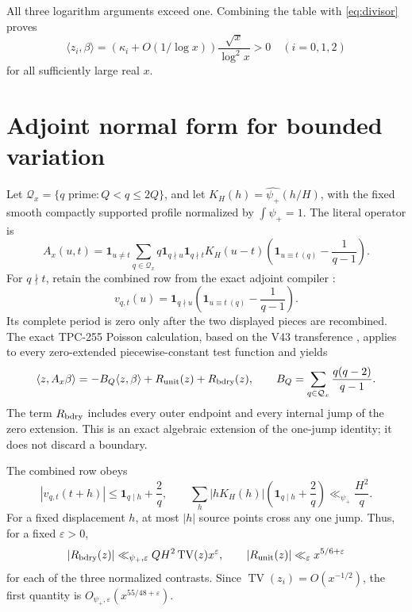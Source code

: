 \documentclass[10pt]{article}
\newcommand{\one}{\mathbf 1}
\newcommand{\ip}[2]{\langle #1,#2\rangle}
\newcommand{\Ax}{A_x}
\newcommand{\Qx}{\mathcal Q_x}
\newcommand{\TV}{\operatorname{TV}}
\newcommand{\e}{\varepsilon}
\begin{document}
All three logarithm arguments exceed one.  Combining the table with
\eqref{eq:divisor} proves
\begin{equation}
 \ip{z_i}{\beta}=(\kappa_i+O(1/\log x))\frac{\sqrt{x}}{\log^2x}>0
 \quad (i=0,1,2)                                  \label{eq:betacontrasts}
\end{equation}
for all sufficiently large real \(x\).

\section{Adjoint normal form for bounded variation}

Let \(\Qx=\{q\text{ prime}:Q<q\leq2Q\}\), and let
\(K_H(h)=\widehat{\psi_+}(h/H)\), with the fixed smooth compactly supported
profile normalized by \(\int\psi_+=1\).  The literal operator is
\begin{equation}
 \Ax(u,t)=\one_{u\ne t}\sum_{q\in\Qx}q\one_{q\nmid u}\one_{q\nmid t}
 K_H(u-t)\left(\one_{u\equiv t\ (q)}-\frac1{q-1}\right). \label{eq:operator}
\end{equation}
For \(q\nmid t\), retain the combined row from the exact adjoint compiler
\cite{tpc255}:
\[
 v_{q,t}(u)=\one_{q\nmid u}\left(\one_{u\equiv t\ (q)}-\frac1{q-1}\right).
\]
Its complete period is zero only after the two displayed pieces are
recombined.  The exact TPC-255 Poisson calculation, based on the V43
transference \cite{v43}, applies to every
zero-extended piecewise-constant test function and yields
\begin{equation}
 \ip{z}{\Ax\beta}=-B_Q\ip{z}{\beta}+R_{\rm unit}(z)+R_{\rm bdry}(z),
 \qquad B_Q=\sum_{q\in\Qx}\frac{q(q-2)}{q-1}.             \label{eq:normalform}
\end{equation}
The term \(R_{\rm bdry}\) includes every outer endpoint and every internal
jump of the zero extension.  This is an exact algebraic extension of the
one-jump identity; it does not discard a boundary.

The combined row obeys
\begin{equation}
 |v_{q,t}(t+h)|\leq\one_{q\mid h}+\frac2q,\qquad
 \sum_h|hK_H(h)|\left(\one_{q\mid h}+\frac2q\right)
 \ll_{\psi_+}\frac{H^2}{q}.                           \label{eq:firstmoment}
\end{equation}
For a fixed displacement \(h\), at most \(|h|\) source points cross any
one jump.  Thus, for a fixed \(\e>0\),
\begin{equation}
 |R_{\rm bdry}(z)|\ll_{\psi_+,\e}QH^2\TV(z)x^\e,
 \qquad |R_{\rm unit}(z)|\ll_\e x^{5/6+\e}             \label{eq:remainders}
\end{equation}
for each of the three normalized contrasts.  Since \(\TV(z_i)=O(x^{-1/2})\),
the first quantity is \(O_{\psi_+,\e}(x^{55/48+\e})\).
\end{document}
